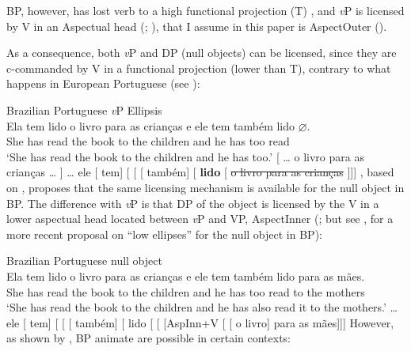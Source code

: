 \documentclass[output=paper]{langsci/langscibook}
\begin{document}
BP, however, has lost verb  to a high functional projection (T)
\citep{Galves2001}, and \emph{v}P  is licensed by V in an Aspectual
head (\citealt{CyrinoMatos2002,CyrinoMatos2005};
\citealt{Cyrino2010,Cyrino2013}), that I assume in this paper is AspectOuter
(\citealt{MacDonald2008}).

As a consequence, both \emph{v}P  and DP  (null objects) can be
licensed, since they are c-commanded by V in a functional projection (lower
than T), contrary to what happens in European Portuguese (see
\citealt{CyrinoMatos2016}):

\ea\label{ex:key:27.6} Brazilian Portuguese \emph{v}P Ellipsis\\
    \ea
        \gll Ela tem lido   o   livro   para   as  crianças e ele     tem também   lido \textbf{$\varnothing$}.\\
            She has read   the   book to     the children and he   has   too read {}\\
        \glt `She has read the book to the children and he has too.'
    \ex {}[ \dots{} o livro para as crianças \dots{} ] \dots{} ele
    [ tem] [ 
    [ [ também]
    [\textbf{ }\textbf{lido}
    [\emph{} \sout{o livro para as crianças} ]]]
    \z
\z
\citet{Cyrino2016}, based on \citet{CyrinoMatos2005}, proposes that the same
licensing mechanism is available for the null object in BP\@.
The difference with \emph{v}P  is that DP  of the
object is licensed by the V in a lower aspectual head located between \emph{v}P
and VP, AspectInner (\citealt{MacDonald2008}; but see
\citealt{Lopes2014,Lopes2015}, for a more recent proposal on ``low ellipses''
for the null object in BP):

\ea\label{ex:key:27.7} Brazilian Portuguese null object\\
    \ea
        \gll Ela tem lido o   livro para as   crianças  e ele tem também lido para as mães.\\
            She has read the book to  the children   and  he  has too read        to     the mothers\\
        \glt   `She has read the book to the children and he has also read it to   the mothers.'
    \ex {} \dots{}  ele [
    tem] [  [   [
    também] [\textbf{} lido [ [
    [AspInn+V  [    [ o livro] para as mães]]]
    \z
\z
However, as shown by \textcite{Cyrino1994,Cyrino1997}, \gls{BP} animate  are possible in certain contexts:
\end{document}
